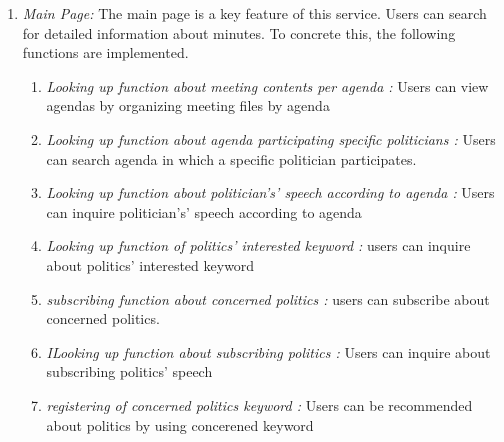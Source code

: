 \documentclass[conference]{IEEEtran}
\begin{document}
\begin{enumerate}
    \item \textit {Main Page:}  The main page is a key feature of this service. Users can search for detailed information about minutes. To concrete this, the following functions are implemented. \\
    \begin{enumerate}
    	\item \textit {Looking up function about meeting contents per agenda :} Users can view agendas by organizing meeting files by agenda\\
        \item \textit {Looking up function about agenda participating specific politicians :} Users can search agenda in which a specific politician participates.\\
        \item \textit {Looking up  function about politician’s' speech according to agenda :} Users can inquire politician’s' speech according to agenda\\
        \item \textit {Looking up function of politics’ interested keyword :} users can inquire about politics’ interested keyword\\
        \item \textit {subscribing function about concerned politics :} users can subscribe about concerned politics.\
        \item \textit {ILooking up  function about subscribing politics :} Users can inquire about subscribing politics’ speech\\
        \item \textit {registering of concerned politics keyword :} Users can be recommended about politics by using concerened keyword
        \\
        \\
        \\
        \\
        \\
        \\
        \\
        \\
        \\
        \\
        \\
        \\
        \\
        \\
        \\
        \\
        \\
        \\
    \end{enumerate}
\end{enumerate}
\end{document}
